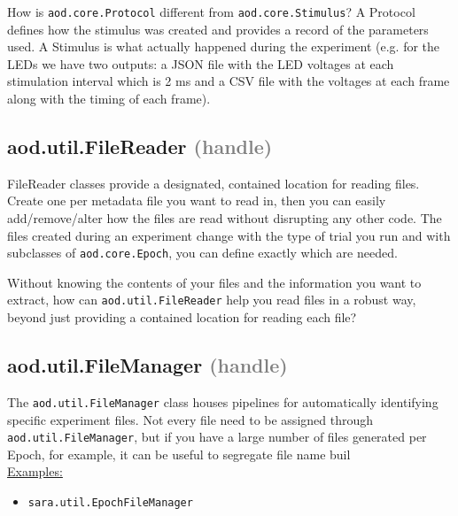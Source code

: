 \documentclass[10pt]{exam}
\newcommand\myparent[1]{\textcolor{gray}{(#1)}}
\newcommand\aodclass[1]{\textcolor{codeblue}{\texttt{#1}}}
\newcommand\docheader[1]{\vspace{0.6ex}\noindent\underline{#1}\vspace{0.15ex}}
\begin{document}
		\noindent How is \aodclass{aod.core.Protocol} different from \aodclass{aod.core.Stimulus}? A Protocol defines how the stimulus was created and provides a record of the parameters used. A Stimulus is what actually happened during the experiment (e.g. for the LEDs we have two outputs: a JSON file with the LED voltages at each stimulation interval which is 2 ms and a CSV file with the voltages at each frame along with the timing of each frame). 
	
	\subsection{aod.util.FileReader \myparent{handle}}
		\label{subsection:FileReaderDoc}
		\noindent FileReader classes provide a designated, contained location for reading files. Create one per metadata file you want to read in, then you can easily add/remove/alter how the files are read without disrupting any other code. The files created during an experiment change with the type of trial you run and with subclasses of \aodclass{aod.core.Epoch}, you can define exactly which are needed. 
		
		Without knowing the contents of your files and the information you want to extract, how can \aodclass{aod.util.FileReader} help you read files in a robust way, beyond just providing a contained location for reading each file?  
	
	\subsection{aod.util.FileManager \myparent{handle}}
		\noindent The \aodclass{aod.util.FileManager} class houses pipelines for automatically identifying specific experiment files. Not every file need to be assigned through \aodclass{aod.util.FileManager}, but if you have a large number of files generated per Epoch, for example, it can be useful to segregate file name buil\\
		\docheader{Examples:}
		\begin{itemize}
			\item \aodclass{sara.util.EpochFileManager}
		\end{itemize}
	
\end{document}
